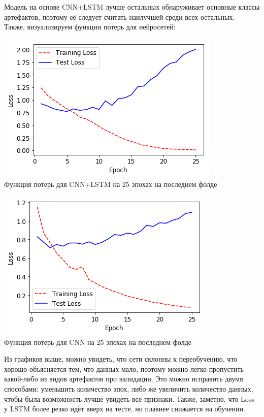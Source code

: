 \documentclass[12pt, a4paper, titlepage]{extreport}
\begin{document}
	Модель на основе CNN+LSTM лучше остальных обнаруживает основные классы артефактов, поэтому её следует считать наилучшей среди всех остальных.\\
	Также, визуализируем функции потерь для нейросетей:\\
			\begin{center}
		\includegraphics[scale=1]{loss_lstm.png}\\
		Функция потерь для CNN+LSTM на 25 эпохах на последнем фолде
	\end{center}
		\begin{center}
	\includegraphics[scale=1]{cnn_loss.png}\\
	Функция потерь для CNN на 25 эпохах на последнем фолде
	\end{center}
	Из графиков выше, можно увидеть, что сети склонны к переобучению, что хорошо объясняется тем, что данных мало, поэтому можно легко пропустить какой-либо из видов артефактов при валидации. Это можно исправить двумя способами: уменьшить количество эпох, либо же увеличить количество данных, чтобы была возможность лучше увидеть все признаки. Также, заметно, что Loss у LSTM более резко идёт вверх на тесте, но плавнее снижается на обучении.
\end{document}
